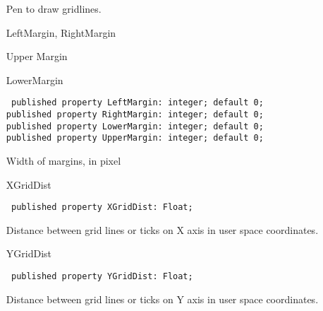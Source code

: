 \documentclass[12pt,a4paper,oneside]{report}
\newcommand{\declarationitem}[1]{{\addfontfeatures{FakeBold=1.3} #1}}
\newcommand{\code}[1]{\texttt{#1}}
\begin{document}
\begin{itemize}
Pen to draw gridlines.
\label{lmcoordsys.TCoordSys-LeftMargin}\label{lmcoordsys.TCoordSys-RightMargin}
\item[\declarationitem{LeftMargin, RightMargin}\hfill]
\item[\declarationitem{Upper Margin}\hfill]
\item[\declarationitem{LowerMargin}\hfill]
\begin{flushleft}
\code{
published property LeftMargin: integer; default 0;\\
published property RightMargin: integer; default 0;\\
published property LowerMargin: integer; default 0;\\
published property UpperMargin: integer; default 0;}
\end{flushleft}
\par Width of margins, in pixel
\label{lmcoordsys.TCoordSys-XGridDist}
\item[\declarationitem{XGridDist}\hfill]
\begin{flushleft}
\code{
published property XGridDist: Float;}
\end{flushleft}
Distance between grid lines or ticks on X axis in user space coordinates. \label{lmcoordsys.TCoordSys-YGridDist}
\item[\declarationitem{YGridDist}\hfill]
\begin{flushleft}
\code{
published property YGridDist: Float;}
\end{flushleft}
Distance between grid lines or ticks on Y axis in user space coordinates. 


\end{itemize}
\end{document}
